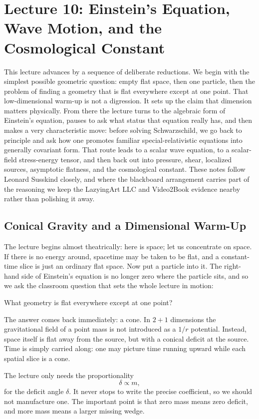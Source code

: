 \chapter{Lecture 10: Einstein's Equation, Wave Motion, and the Cosmological Constant}

This lecture advances by a sequence of deliberate reductions. We begin with the simplest possible geometric question: empty flat space, then one particle, then the problem of finding a geometry that is flat everywhere except at one point. That low-dimensional warm-up is not a digression. It sets up the claim that dimension matters physically. From there the lecture turns to the algebraic form of Einstein's equation, pauses to ask what status that equation really has, and then makes a very characteristic move: before solving Schwarzschild, we go back to principle and ask how one promotes familiar special-relativistic equations into generally covariant form. That route leads to a scalar wave equation, to a scalar-field stress-energy tensor, and then back out into pressure, shear, localized sources, asymptotic flatness, and the cosmological constant. These notes follow Leonard Susskind closely, and where the blackboard arrangement carries part of the reasoning we keep the LazyingArt LLC and Video2Book evidence nearby rather than polishing it away.

\section{Conical Gravity and a Dimensional Warm-Up}

The lecture begins almost theatrically: here is space; let us concentrate on space. If there is no energy around, spacetime may be taken to be flat, and a constant-time slice is just an ordinary flat space. Now put a particle into it. The right-hand side of Einstein's equation is no longer zero where the particle sits, and so we ask the classroom question that sets the whole lecture in motion:

What geometry is flat everywhere except at one point?

The answer comes back immediately: a cone. In \(2+1\) dimensions the gravitational field of a point mass is not introduced as a \(1/r\) potential. Instead, space itself is flat away from the source, but with a conical deficit at the source. Time is simply carried along: one may picture time running upward while each spatial slice is a cone.

The lecture only needs the proportionality
\begin{equation}
\delta \propto m,
\end{equation}
for the deficit angle \(\delta\). It never stops to write the precise coefficient, so we should not manufacture one. The important point is that zero mass means zero deficit, and more mass means a larger missing wedge.

